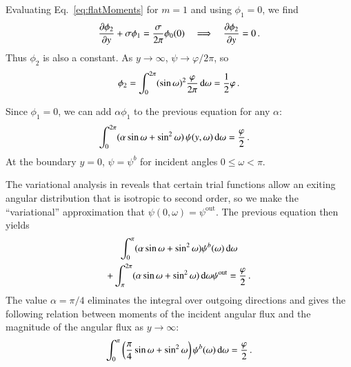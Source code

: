 \documentclass{anstrans}
\begin{document}
Evaluating Eq.~\eqref{eq:flatMoments} for $m=1$ and using
$\phi_{1}=0$, we find
\begin{equation*}
  \frac{\partial \phi_{2}}{\partial y}
  + \sigma \phi_{1}
  = \frac{\sigma}{2\pi} \phi_{0} (0)
  \quad \Longrightarrow \quad
  \frac{\partial \phi_{2}}{\partial y} = 0\,.
\end{equation*}
Thus $\phi_{2}$ is also a constant. As $y\to\infty$, $\psi\to\varphi/2\pi$, so
\begin{equation*}
  \phi_{2} = \int_{0}^{2\pi} (\sin\omega)^2 \frac{\varphi}{2\pi} \mathop{}\!\mathrm{d}\omega
  = \frac{1}{2} \varphi\,.
\end{equation*}

Since $\phi_1=0$, we can add $\alpha \phi_1$ to the previous equation for any
$\alpha$:
\begin{align*}
 \int_{0}^{2\pi} (\alpha \sin\omega + \sin^2\omega)\,
 \psi(y,\omega) \mathop{}\!\mathrm{d}\omega
 &= \frac{\varphi}{2}\,.
\end{align*}
At the boundary $y=0$, $\psi=\psi^b$ for incident angles $0 \le \omega < \pi$.

The variational analysis in \cite{Mal1991} reveals that certain trial functions
allow an exiting angular distribution that is isotropic to second order, so
we make the ``variational'' approximation that $\psi(0,\omega)=\psi^\text{out}$.
The previous equation then yields
\begin{multline*}
 \int_{0}^{\pi} (\alpha \sin\omega + \sin^2\omega)
 \psi^b(\omega) \mathop{}\!\mathrm{d}\omega
\\ + \int_{\pi}^{2\pi} (\alpha \sin\omega + \sin^2\omega)\mathop{}\!\mathrm{d}\omega \psi^\text{out}
 = \frac{\varphi}{2}\,.
\end{multline*}
The value $\alpha=\pi/4$ eliminates the integral over outgoing directions and
gives the following relation between moments of the incident angular flux and the
magnitude of the angular flux as $y\to\infty$:
\begin{equation}\label{eq:varBoundary}
  \int_{0}^{\pi} \left( \frac{\pi}{4} \sin\omega + \sin^2\omega \right)
 \psi^b(\omega) \mathop{}\!\mathrm{d}\omega
 = \frac{\varphi}{2}\,.
\end{equation}
\end{document}
